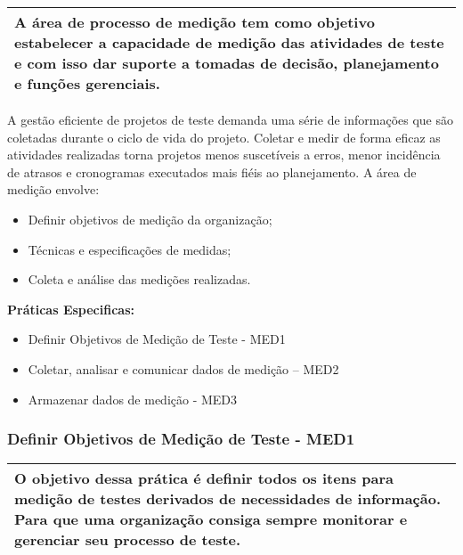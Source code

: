 \begin{table}[!ht]
\centering
\begin{tabular}{|p{130mm}|}
\hline
A área de processo de medição tem como objetivo estabelecer a capacidade de medição das atividades de teste e com isso dar suporte a tomadas de decisão, planejamento e funções gerenciais. \\ 
\hline
\end{tabular}
\end{table}

A gestão eficiente de projetos de teste demanda uma série de informações que são coletadas durante o ciclo de vida do projeto. Coletar e medir de forma eficaz as atividades realizadas torna projetos menos suscetíveis a erros, menor incidência de atrasos e cronogramas executados mais fiéis ao planejamento. A área de medição envolve:

\begin{itemize}
    \item Definir objetivos de medição da organização;
    \item Técnicas e especificações de medidas;
    \item Coleta e análise das medições realizadas.
\end{itemize}

\textbf{Práticas Especificas: }
\begin{itemize}
    \item Definir Objetivos de Medição de Teste - MED1
    \item Coletar, analisar e comunicar dados de medição – MED2
    \item Armazenar dados de medição - MED3
\end{itemize}

\subsubsection{Definir Objetivos de Medição de Teste - MED1}
\label{sec:med1}

\begin{table}[!ht]
\centering
\begin{tabular}{|p{130mm}|}
\hline
O objetivo dessa prática é definir todos os itens para medição de testes derivados de necessidades de informação. Para que uma organização consiga sempre monitorar e gerenciar seu processo de teste. \\ 
\hline
\end{tabular}
\end{table}

